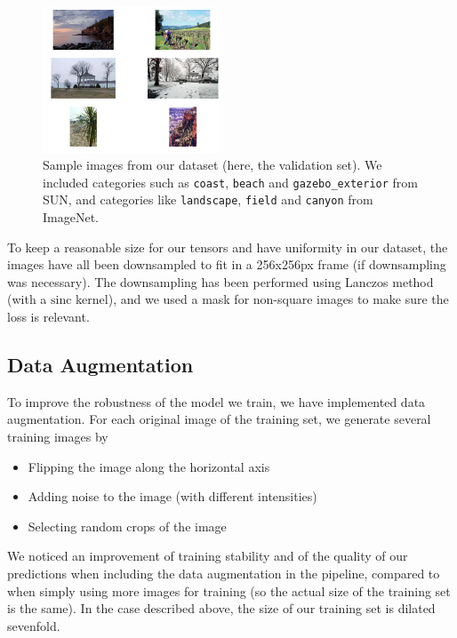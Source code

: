 \documentclass[10pt,twocolumn,letterpaper]{article}
\begin{document}
\begin{figure}
\begin{center}
\includegraphics[width=200px]{sampletrain.png}
\caption{Sample images from our dataset (here, the validation set). We included categories such as \texttt{coast}, \texttt{beach} and \texttt{gazebo\_exterior} from SUN, and categories like \texttt{landscape}, \texttt{field} and \texttt{canyon} from ImageNet.}
\label{sampletrain}
\end{center}
\end{figure}

To keep a reasonable size for our tensors and have uniformity in our dataset, the images have all been downsampled to fit in a 256x256px frame (if downsampling was necessary). The downsampling has been performed using Lanczos method (with a $\text{sinc}$ kernel), and we used a mask for non-square images to make sure the loss is relevant.

\subsection{Data Augmentation}

To improve the robustness of the model we train, we have implemented data augmentation. For each original image of the training set, we generate several training images by
\begin{itemize}
\item Flipping the image along the horizontal axis
\item Adding noise to the image (with different intensities)
\item Selecting random crops of the image
\end{itemize}

We noticed an improvement of training stability and of the quality of our predictions when including the data augmentation in the pipeline, compared to when simply using more images for training (so the actual size of the training set is the same). In the case described above, the size of our training set is dilated sevenfold.
\end{document}
